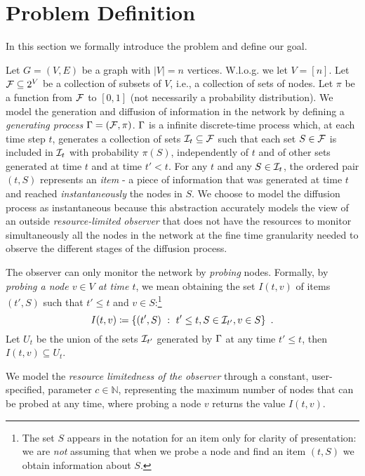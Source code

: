 \section{Problem Definition}\label{sec:prelims}
In this section we formally introduce the problem and define our goal.

Let $G=(V,E)$ be a graph with $|V|=n$ vertices. W.l.o.g. we let $V=[n]$. Let
$\mathcal{F}\subseteq 2^V$ be a collection of subsets of $V$, i.e., a collection of
sets of nodes. Let $\pi$ be a function from $\mathcal{F}$ to $[0,1]$ (not
necessarily a probability distribution). We model the generation and diffusion
of  information in the network by defining a \emph{generating
process} $\Gamma=(\mathcal{F},\pi)$.  $\Gamma$ is a infinite discrete-time process
which, at each time step $t$, generates a collection of sets $\mathcal{I}_t\subseteq\mathcal{F}$ such
that each set $S\in\mathcal{F}$ is included in $\mathcal{I}_t$ with probability $\pi(S)$,
independently of $t$ and of other sets generated at time $t$ and at time $t'<t$.
For any $t$ and any $S\in\mathcal{I}_t$, the ordered pair $(t,S)$ represents an
\emph{item} - a piece of information that was generated at time
$t$ and reached \emph{instantaneously} the nodes in $S$. We choose to model the
diffusion process as instantaneous because this abstraction accurately models the view of an outside
\emph{resource-limited observer} that does not have the resources to monitor simultaneously all
the nodes in the network at the fine time granularity needed to observe the
different stages of the diffusion process.

 The observer can only monitor the network by
\emph{probing} nodes. Formally, by \emph{probing a node $v\in V$ at time $t$},
we mean obtaining the set $I(t,v)$ of items $(t',S)$ such
that $t'\le t$ and $v\in S$:\footnote{The set $S$ appears in the notation for an
	item only for clarity of presentation: we are \emph{not} assuming that when
we probe a node and find an item $(t,S)$ we obtain information about $S$.}
\[
	I(t,v)\coloneqq\{(t',S) ~:~ t'\le t, S\in\mathcal{I}_{t'}, v\in S\}\enspace.
\]
Let $U_t$ be the union of the sets $\mathcal{I}_{t'}$ generated by $\Gamma$
at any time $t'\le t$, then $I(t,v)\subseteq U_t$.

%
We model the \emph{resource limitedness of the observer} through a constant,
user-specified, parameter $c\in\mathbb{N}$, representing the maximum number of
nodes that can be probed at any time, where probing a node $v$ returns the value $I(t,v)$.

